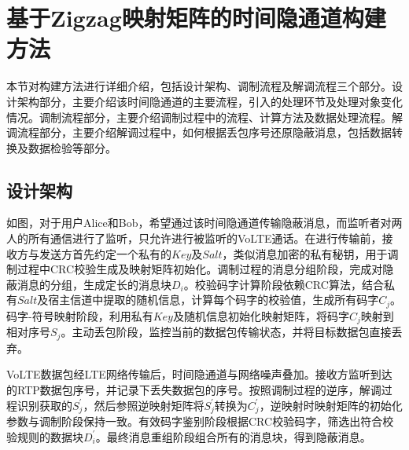 \section{基于Zigzag映射矩阵的时间隐通道构建方法}
\label{chap:zigzag:model}

本节对构建方法进行详细介绍，包括设计架构、调制流程及解调流程三个部分。设计架构部分，主要介绍该时间隐通道的主要流程，引入的处理环节及处理对象变化情况。调制流程部分，主要介绍调制过程中的流程、计算方法及数据处理流程。解调流程部分，主要介绍解调过程中，如何根据丢包序号还原隐蔽消息，包括数据转换及数据检验等部分。

\subsection{设计架构}
\label{chap:zigzag:model:system}


如图，对于用户Alice和Bob，希望通过该时间隐通道传输隐蔽消息，而监听者对两人的所有通信进行了监听，只允许进行被监听的VoLTE通话。在进行传输前，接收方与发送方首先约定一个私有的$Key$及$Salt$，类似消息加密的私有秘钥，用于调制过程中CRC校验生成及映射矩阵初始化。调制过程的消息分组阶段，完成对隐蔽消息的分组，生成定长的消息块$D_{i}$。校验码字计算阶段依赖CRC算法，结合私有$Salt$及宿主信道中提取的随机信息，计算每个码字的校验值，生成所有码字$C_{j}$。码字-符号映射阶段，利用私有$Key$及随机信息初始化映射矩阵，将码字$C_{j}$映射到相对序号$S_{j}$。主动丢包阶段，监控当前的数据包传输状态，并将目标数据包直接丢弃。

VoLTE数据包经LTE网络传输后，时间隐通道与网络噪声叠加。接收方监听到达的RTP数据包序号，并记录下丢失数据包的序号。按照调制过程的逆序，解调过程识别获取的$S_{j}^{'}$，然后参照逆映射矩阵将$S_{j}^{'}$转换为$C_{j}^{'}$，逆映射时映射矩阵的初始化参数与调制阶段保持一致。有效码字鉴别阶段根据CRC校验码字，筛选出符合校验规则的数据块$D_{i}^{'}$。最终消息重组阶段组合所有的消息块，得到隐蔽消息。

